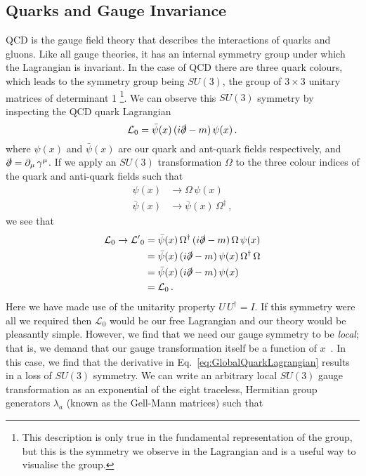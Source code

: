 \subsection{Quarks and Gauge Invariance}
QCD is the gauge field theory that describes the interactions of quarks and gluons. Like all gauge theories, it has an internal symmetry group under which the Lagrangian is invariant. In the case of QCD there are three quark colours, which leads to the symmetry group being $SU(3)$, the group of $3\times 3$ unitary matrices of determinant 1 \footnote{This description is only true in the fundamental representation of the group, but this is the symmetry we observe in the Lagrangian and is a useful way to visualise the group.}. We can observe this $SU(3)$ symmetry by inspecting the QCD quark Lagrangian
%
\begin{equation}
\mathcal{L}_0 = \bar{\psi}(x)\,(i\slashed{\partial}-m)\,\psi(x)\,.
\label{eq:GlobalQuarkLagrangian}
\end{equation}
%
where $\psi(x)$ and $\bar{\psi}(x)$ are our quark and ant-quark fields respectively, and $\slashed{\partial}=\partial_\mu\,\gamma^\mu$. If we apply an $SU(3)$ transformation $\Omega$ to the three colour indices of the quark and anti-quark fields such that
%
\begin{align*}
\psi(x)&\rightarrow\Omega\,\psi(x)\\
\bar{\psi}(x)&\rightarrow \bar{\psi}(x)\,\Omega^\dagger\, ,
\end{align*}
%
we see that
%
\begin{align*}
\mathcal{L}_0\rightarrow\mathcal{L'}_0&=\bar{\psi}(x)\,\Omega^\dag\,(i\slashed{\partial}-m)\,\Omega\,\psi(x)\\
&= \bar{\psi}(x)\,(i\slashed{\partial}-m)\,\psi(x)\,\Omega^\dag\,\Omega\\
&= \bar{\psi}(x)\,(i\slashed{\partial}-m)\,\psi(x)\\
&= \mathcal{L}_0\, .
\end{align*}
%
Here we have made use of the unitarity property $U\,U^\dag = I$. If this symmetry were all we required then $\mathcal{L}_0$ would be our free Lagrangian and our theory would be pleasantly simple. However, we find that we need our gauge symmetry to be \textit{local}; that is, we demand that our gauge transformation itself be a function of $x$~\cite{peskin2018introduction}. In this case, we find that the derivative in Eq.~\ref{eq:GlobalQuarkLagrangian} results in a loss of $SU(3)$ symmetry. We can write an arbitrary local $SU(3)$ gauge transformation as an exponential of the eight traceless, Hermitian group generators $\lambda_a$ (known as the Gell-Mann matrices) such that 

